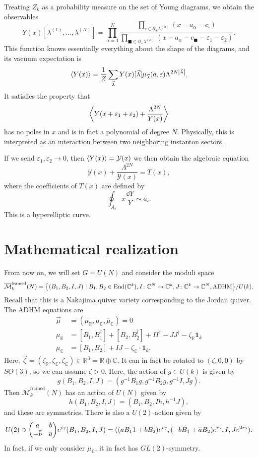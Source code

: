 \documentclass[leqno, openany]{memoir}
\theoremstyle{definition}
\theoremstyle{remark}
\theoremstyle{plain}
\theoremstyle{definition}
\theoremstyle{remark}
\newcommand{\R}{\mathbb{R}}
\newcommand{\C}{\mathbb{C}}
\newcommand{\ep}{\varepsilon}
\newcommand{\mc}[1]{\mathcal{#1}}
\newcommand{\mr}[1]{\mathrm{#1}}
\newcommand{\ol}[1]{\overline{#1}}
\DeclareMathOperator{\End}{End}
\begin{document}
Treating $Z_k$ as a probability measure on the set of Young diagrams, we obtain the observables
\[ Y(x)[\lambda^{(1)}, \ldots, \lambda^{(N)}] = \prod_{\alpha =1}^N \frac{\prod_{\square \in \partial_+ \lambda^{(\alpha)}}(x-a_{\alpha}-c_{\square})}{\prod_{\blacksquare \in \partial_- \lambda^{(\alpha)}}(x-a_{\alpha}-c_{\blacksquare}-\ep_1-\ep_2)}. \]
This function knows essentially everything about the shape of the diagrams, and its vacuum expectation is
\[ \ev{Y(x)} = \frac{1}{Z} \sum_{\vec{\lambda}} Y(x)[\vec{\lambda}] \mu_{\vec{\lambda}}(a,\ep) \Lambda^{2N\abs{\vec{\lambda}}}. \]
It satisfies the property that
\[ \ev{Y(x+\ep_1 + \ep_2) + \frac{\Lambda^{2N}}{Y(x)}} \]
has no poles in $x$ and is in fact a polynomial of degree $N$. Physically, this is interpreted as an interaction between two neighboring instanton sectors.

If we send $\ep_1, \ep_2 \to 0$, then $\ev{Y(x)} = \mc{Y}(x)$ we then obtain the algebraic equation
\[ \mc{Y}(x) + \frac{\Lambda^{2N}}{\mc{Y}(x)} = T(x), \]
where the coefficients of $T(x)$ are defined by
\[ \oint_{A_i} x \frac{\dd Y}{Y} \sim a_i. \]
This is a hyperelliptic curve.

\section{Mathematical realization}

From now on, we will set $G = U(N)$ and consider the moduli space
\[ \ol{\mc{M}}_k^{\mr{framed}}(N) = \qty{(B_1, B_2, I, J) \mid B_1, B_2 \in \End(\C^k), I \colon \C^N \to \C^k, J \colon \C^k \to \C^N, \text{ADHM}} / U(k). \]
Recall that this is a Nakajima quiver variety corresponding to the Jordan quiver. The ADHM equations are
\begin{align*}
    \vec{\mu} &= (\mu_{\R}, \mu_{\C}, \ol{\mu}_{\C}) = 0 \\
    \mu_{\R} &= [B_1, B_1^{\dag}] + [B_2, B_2^{\dag}] + II^{\dag} - JJ^{\dag} - \zeta_{\R} \mathbf{1}_k \\
    \mu_{\C} &= [B_1, B_2] + IJ - \zeta_{\C} \cdot \mathbf{1}_k.
\end{align*}
Here, $\vec{\zeta} = (\zeta_{\R}, \zeta_{\C}, \ol{\zeta}_{\C}) \in \R^3 = \R \oplus \C$. It can in fact be rotated to $(\zeta, 0, 0)$ by $SO(3)$, so we can assume $\zeta > 0$. Here, the action of $g \in U(k)$ is given by
\[ g(B_1, B_2, I, J) = (g^{-1}B_1 g, g^{-1} B_2 g, g^{-1} I, Jg). \]
Then $\ol{\mc{M}}_k^{\mr{framed}}(N)$ has an action of $U(N)$ given by
\[ h(B_1, B_2, I, J) = (B_1, B_2, Ih, h^{-1}J), \]
and these are symmetries. There is also a $U(2)$-action given by
\[ U(2) \ni \mqty(a & b \\ -\ol{b} & \ol{a}) e^{i\gamma} (B_1, B_2, I, J) = ((aB_11 + bB_2)e^{i\gamma}, (-\ol{b} B_1 + \ol{a} B_2)e^{i\gamma}, I, J e^{2i\gamma}). \]
In fact, if we only consider $\mu_{\C}$, it in fact has $GL(2)$-symmetry.
\end{document}
